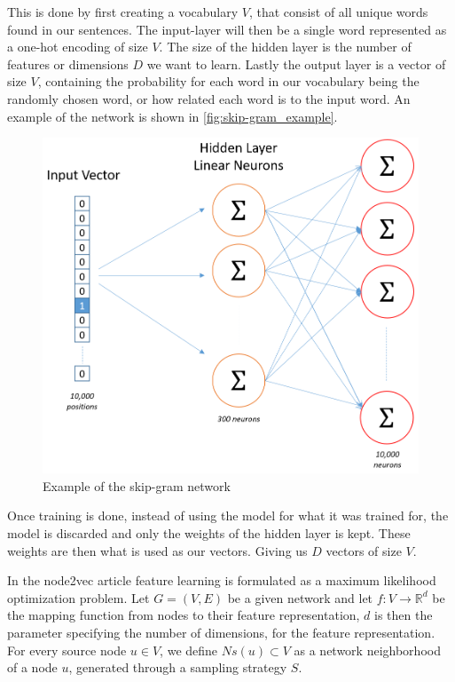 This is done by first creating a vocabulary $V$, that consist of all unique words found in our sentences. The input-layer will then be a single word represented as a one-hot encoding of size $V$. The size of the hidden layer is the number of features or dimensions $D$ we want to learn. Lastly the output layer is a vector of size $V$, containing the probability for each word in our vocabulary being the randomly chosen word, or how related each word is to the input word. An example of the network is shown in \autoref{fig:skip-gram_example}.

\begin{figure}[H]
\centering
  \includegraphics[width=\linewidth]{Article/figures/skip_gram_net_arch.png}
  \caption{Example of the skip-gram network}
  \label{fig:skip-gram_example}
\end{figure}

Once training is done, instead of using the model for what it was trained for, the model is discarded and only the weights of the hidden layer is kept. These weights are then what is used as our vectors. Giving us $D$ vectors of size $V$.

In the node2vec article feature learning is formulated as a maximum likelihood optimization problem. Let $G = (V,E)$ be a given network and let $f : V \to \mathbb{R}^d$ be the mapping function from nodes to their feature representation, $d$ is then the parameter specifying the number of dimensions, for the feature representation. For every source node $u \in V$, we define $Ns(u) \subset V$ as a network neighborhood of a node $u$, generated through a sampling strategy $S$.

